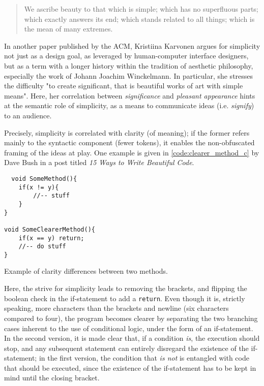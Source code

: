 \begin{quote}
  We ascribe beauty to that which is simple; which has no superfluous parts; which exactly answers its end; which stands related to all things; which is the mean of many extremes.\cite{gibbons_beauty_2012}
\end{quote}

In another paper published by the ACM, Kristiina Karvonen argues for simplicity not just as a design goal, as leveraged by human-computer interface designers, but as a term with a longer history within the tradition of aesthetic philosophy, especially the work of Johann Joachim Winckelmann\cite{karvonen_beauty_2000}. In particular, she stresses the difficulty "to create significant, that is beautiful works of art with simple means"\cite{karvonen_beauty_2000}. Here, her correlation between \emph{significance} and \emph{pleasant appearance} hints at the semantic role of simplicity, as a means to communicate ideas (i.e. \emph{signify}) to an audience.

Precisely, simplicity is correlated with clarity (of meaning); if the former refers mainly to the syntactic component (fewer tokens), it enables the non-obfuscated framing of the ideas at play. One example is given in \ref{code:clearer_method_c} by Dave Bush in a post titled  \emph{15 Ways to Write Beautiful Code}.

\begin{listing}
  \begin{verbatim}
  void SomeMethod(){
    if(x != y){
        //-- stuff
    }
}

void SomeClearerMethod(){
    if(x == y) return;
    //-- do stuff
}
\end{verbatim}
  \caption{Example of clarity differences between two methods.}
  \label{code:clearer_method_c}
\end{listing}

Here, the strive for simplicity leads to removing the brackets, and flipping the boolean check in the if-statement to add a \lstinline{return}. Even though it is, strictly speaking, more characters than the brackets and newline (six characters compared to four), the program becomes clearer by separating the two branching cases inherent to the use of conditional logic, under the form of an if-statement. In the second version, it is made clear that, if a condition \emph{is}, the execution should stop, and any subsequent statement can entirely disregard the existence of the if-statement; in the first version, the condition that \emph{is not} is entangled with code that should be executed, since the existence of the if-statement has to be kept in mind until the closing bracket\cite{bush_15_2015}.

